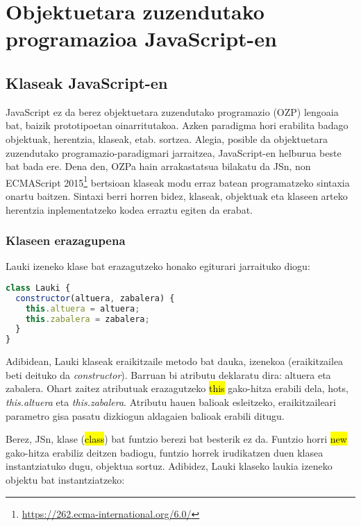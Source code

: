 \chapter{Objektuetara zuzendutako programazioa JavaScript-en}

\section{Klaseak JavaScript-en}
JavaScript ez da berez objektuetara zuzendutako programazio (OZP) lengoaia bat, baizik prototipoetan oinarritutakoa. Azken paradigma hori erabilita badago objektuak, herentzia, klaseak, etab. sortzea. Alegia, posible da objektuetara zuzendutako programazio-paradigmari jarraitzea, JavaScript-en helburua beste bat bada ere. Dena den, OZPa hain arrakastatsua bilakatu da JSn, non  ECMAScript 2015\footnote{\href{https://262.ecma-international.org/6.0/}{https://262.ecma-international.org/6.0/}} bertsioan klaseak modu erraz batean programatzeko sintaxia onartu baitzen. Sintaxi berri horren bidez, klaseak, objektuak eta klaseen arteko herentzia inplementatzeko kodea erraztu egiten da erabat.

\subsection{Klaseen erazagupena}

Lauki izeneko klase bat erazagutzeko honako egiturari jarraituko diogu:


\begin{lstlisting}[language=JavaScript, numbers=none]
class Lauki {
  constructor(altuera, zabalera) {
    this.altuera = altuera;
    this.zabalera = zabalera;
  }
}
\end{lstlisting}

Adibidean, Lauki klaseak eraikitzaile metodo bat dauka,  izenekoa (eraikitzailea beti deituko da \textit{constructor}). Barruan bi atributu deklaratu dira: altuera eta zabalera. Ohart zaitez atributuak erazagutzeko \hl{this} gako-hitza erabili dela, hots, \textit{this.altuera} eta \textit{this.zabalera}. Atributu hauen balioak esleitzeko, eraikitzaileari  parametro gisa pasatu dizkiogun aldagaien balioak erabili ditugu.

Berez, JSn, klase (\hl{class}) bat funtzio berezi bat besterik ez da. Funtzio horri \hl{new} gako-hitza erabiliz deitzen badiogu, funtzio horrek irudikatzen duen klasea instantziatuko dugu, objektua sortuz. Adibidez, Lauki klaseko laukia izeneko objektu bat instantziatzeko:

